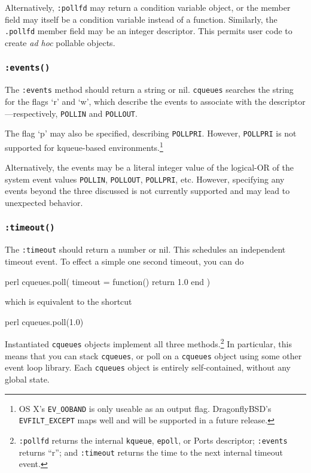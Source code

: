 \documentclass[11pt, oneside]{memoir}
\newcommand*{\cqueues}[0]{\texttt{cqueues}\xspace}
\newcommand*{\syscall}[1]{\texttt{#1}\xspace}
\newcommand*{\method}[1]{\texttt{#1}\xspace}
\begin{document}
Alternatively, \method{:pollfd} may return a condition variable object, or the member field may itself
be a condition variable instead of a function.  Similarly, the \texttt{.pollfd} member field may be an integer descriptor. This permits user code to create \textit{ad hoc} pollable objects.

\subsubsection[\method{object:events}]{\method{:events()}} The \method{:events} method should return a string or nil. \cqueues searches the string for the flags `r' and `w', which describe the events to associate with the descriptor---respectively, \texttt{POLLIN} and \texttt{POLLOUT}.

The flag `p' may also be specified, describing \texttt{POLLPRI}. However, \texttt{POLLPRI} is not supported for kqueue-based environments.\footnote{OS X's \texttt{EV\_OOBAND} is only useable as an output flag. DragonflyBSD's \texttt{EVFILT\_EXCEPT} maps well and will be supported in a future release.}

Alternatively, the events may be a literal integer value of the logical-OR of the system event values \texttt{POLLIN}, \texttt{POLLOUT}, \texttt{POLLPRI}, etc. However, specifying any events beyond the three discussed is not currently supported and may lead to unexpected behavior.

\subsubsection[\method{object:timeout}]{\method{:timeout()}} The \method{:timeout} should return a number or nil. This schedules an independent timeout event. To effect a simple one second timeout, you can do

\begin{code}{perl}
        cqueues.poll({ timeout = function() return 1.0 end })
\end{code}

which is equivalent to the shortcut

\begin{code}{perl}
	cqueues.poll(1.0)
\end{code}

Instantiated \cqueues objects implement all three methods.\footnote{\method{:pollfd} returns the internal \syscall{kqueue}, \syscall{epoll}, or Ports descriptor; \method{:events} returns ``r''; and \method{:timeout} returns the time to the next internal timeout event.} In particular, this means that you can stack \cqueues, or poll on a \cqueues object using some other event loop library. Each \cqueues object is entirely self-contained, without any global state.
\end{document}
